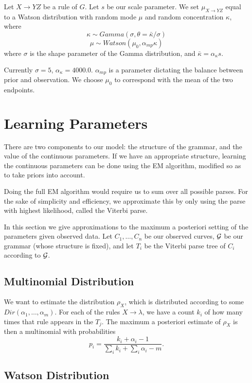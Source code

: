 \documentclass{article}
\begin{document}
Let $X\to YZ$ be a rule of $G$. Let $s$ be our scale parameter.  We
set $\mu_{X\to YZ}$ equal to a Watson distribution with random mode $\mu$ and
random concentration $\kappa$, where
$$\kappa \sim Gamma(\sigma, \theta=\bar{\kappa}/\sigma)$$
$$\mu \sim Watson(\mu_0, \alpha_{mp} \kappa)$$
where $\sigma$ is the shape parameter of the Gamma distribution, and
$\bar{\kappa} = \alpha_{\kappa} s$. 

Currently $\sigma=5$, $\alpha_\kappa = 4000.0$. $\alpha_{mp}$ is a
parameter dictating the balance between prior and observation.  We
choose $\mu_0$ to correspond with the mean of the two endpoints.

\section{Learning Parameters}

There are two components to our model: the structure of the grammar,
and the value of the continuous parameters. If we have an appropriate
structure, learning the continuous parameters can be done using the EM
algorithm, modified so as to take priors into account.

Doing the full EM algorithm would require us to sum over all possible
parses. For the sake of simplicity and efficiency, we approximate this
by only using the parse with highest likelihood, called the Viterbi
parse.

In this section we give approximations to the maximum a posteriori
setting of the parameters given observed data. Let $C_1, \dots, C_n$
be our observed curves, ${\mathcal G}$ be our grammar (whose structure is
fixed), and let $T_i$ be the Viterbi parse tree of $C_i$ according to
${\mathcal G}$.

\subsection{Multinomial Distribution}

We want to estimate the distribution $\rho_X$, which is distributed
according to some $Dir(\alpha_1, \dots, \alpha_m)$. For each of the
rules $X\to \lambda$, we have a count $k_i$ of how many times that
rule appears in the $T_j$. The maximum a posteriori estimate of
$\rho_X$ is then a multinomial with probabilities 
$$p_i = \frac{k_i + \alpha_i - 1}{\sum_i k_i + \sum_i \alpha_i - m}.$$

\subsection{Watson Distribution}
\end{document}
